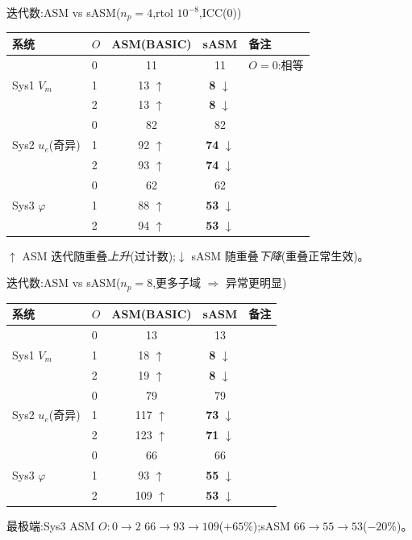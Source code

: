\documentclass[aspectratio=169,11pt,fontset=fandol]{ctexbeamer}
\newcommand{\up}{\textcolor{bad}{$\uparrow$}}
\newcommand{\dn}{\textcolor{good}{$\downarrow$}}
\begin{document}
\begin{frame}{迭代数:ASM vs sASM($n_p{=}4$,rtol $10^{-8}$,ICC(0))}
\begin{table}\small
\begin{tabular}{@{}llccl@{}}
\toprule
系统 & $O$ & ASM(BASIC) & sASM & 备注 \\
\midrule
\multirow{3}{*}{Sys1 $V_m$}
 & 0 & 11 & 11 & $O{=}0$:相等 \\
 & 1 & 13 \up & \textbf{8} \dn & \\
 & 2 & 13 \up & \textbf{8} \dn & \\
\midrule
\multirow{3}{*}{Sys2 $u_e$(奇异)}
 & 0 & 82 & 82 & \\
 & 1 & 92 \up & \textbf{74} \dn & \\
 & 2 & 93 \up & \textbf{74} \dn & \\
\midrule
\multirow{3}{*}{Sys3 $\varphi$}
 & 0 & 62 & 62 & \\
 & 1 & 88 \up & \textbf{53} \dn & \\
 & 2 & 94 \up & \textbf{53} \dn & \\
\bottomrule
\end{tabular}
\end{table}
\vspace{-0.3em}
\footnotesize \textcolor{bad}{$\uparrow$ ASM 迭代随重叠\emph{上升}}(过计数);\textcolor{good}{$\downarrow$ sASM 随重叠\emph{下降}}(重叠正常生效)。
\end{frame}

\begin{frame}{迭代数:ASM vs sASM($n_p{=}8$,更多子域 $\Rightarrow$ 异常更明显)}
\begin{table}\small
\begin{tabular}{@{}llccl@{}}
\toprule
系统 & $O$ & ASM(BASIC) & sASM & 备注 \\
\midrule
\multirow{3}{*}{Sys1 $V_m$}
 & 0 & 13 & 13 & \\
 & 1 & 18 \up & \textbf{8} \dn & \\
 & 2 & 19 \up & \textbf{8} \dn & \\
\midrule
\multirow{3}{*}{Sys2 $u_e$(奇异)}
 & 0 & 79 & 79 & \\
 & 1 & 117 \up & \textbf{73} \dn & \\
 & 2 & 123 \up & \textbf{71} \dn & \\
\midrule
\multirow{3}{*}{Sys3 $\varphi$}
 & 0 & 66 & 66 & \\
 & 1 & 93 \up & \textbf{55} \dn & \\
 & 2 & 109 \up & \textbf{53} \dn & \\
\bottomrule
\end{tabular}
\end{table}
\vspace{-0.3em}
\footnotesize 最极端:Sys3 ASM $O{:}0{\to}2$ \textcolor{bad}{$66{\to}93{\to}109$($+65\%$)};sASM \textcolor{good}{$66{\to}55{\to}53$($-20\%$)}。
\end{frame}
\end{document}
